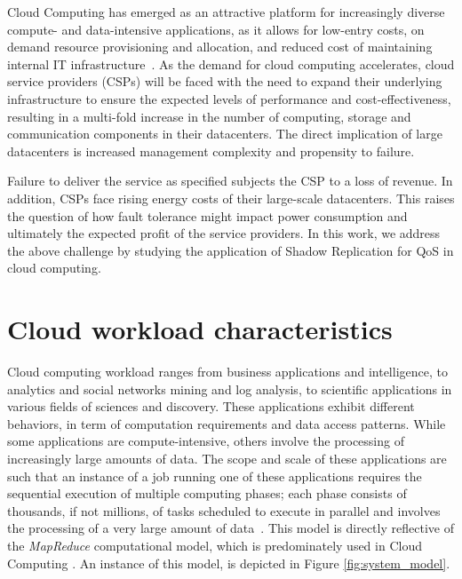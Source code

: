 Cloud Computing has emerged as an attractive platform for increasingly
diverse compute- and data-intensive applications, as it allows for
low-entry costs, on demand resource provisioning and allocation, and
reduced cost of maintaining internal IT
infrastructure~\cite{tchana_cits_2012}. %
As the demand for cloud computing
accelerates, cloud service providers (CSPs) will be faced with the
need to expand their underlying infrastructure to ensure the expected
levels of performance and cost-effectiveness, resulting
in a multi-fold increase in the number of computing, storage and
communication components in their datacenters. The direct implication of large datacenters is increased management complexity and propensity to
failure.

Failure to deliver
the service as specified subjects the CSP to a loss of revenue. In addition, CSPs face rising energy costs of their large-scale
datacenters. This raises the question of how
fault tolerance might impact power consumption and ultimately the
expected profit of the service providers. In this work, we address the above challenge 
by studying the application of Shadow Replication for QoS in cloud computing.

\section{Cloud workload characteristics}

Cloud computing workload ranges from business applications and
intelligence, to analytics and social networks mining and log
analysis, to scientific applications in various fields of sciences and
discovery. These applications exhibit different behaviors, in term of
computation requirements and data access patterns. While some
applications are compute-intensive, others involve the processing of
increasingly large amounts of data. The scope and scale of these
applications are such that an instance of a job running one of these
applications requires the sequential execution of multiple computing
phases; each phase consists of thousands, if not millions, of tasks
scheduled to execute in parallel and involves the processing of a very
large amount of data~\cite{lin2010data,Ferdman:2012:CCS:2150976.2150982}. This
model is directly reflective of the \emph{MapReduce} computational
model, which is predominately used in
Cloud Computing \cite{mrbs}.  An instance of this model, is depicted in Figure \ref{fig:system_model}.



